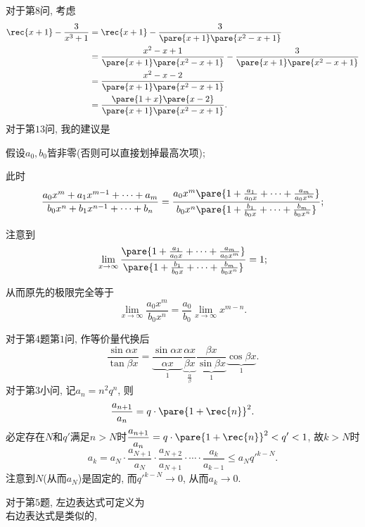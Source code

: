 \documentclass{ctexart}
\begin{document}
对于第$8$问, 考虑
\begin{align*}
    \rec{x+1} - \frac{3}{x^3+1} &= \rec{x+1} - \frac{3}{\pare{x+1}\pare{x^2-x+1}} \\
    &= \frac{x^2-x+1}{\pare{x+1}\pare{x^2-x+1}} -\frac{3}{\pare{x+1}\pare{x^2-x+1}} \\
    &= \frac{x^2-x-2}{\pare{x+1}\pare{x^2-x+1}} \\
    &= \frac{\pare{1+x}\pare{x-2}}{\pare{x+1}\pare{x^2-x+1}}.
\end{align*}
对于第$13$问, 我的建议是
\begin{cenum}
    \item 假设$a_0, b_0$皆非零(否则可以直接划掉最高次项);
    \item 此时
    \[ \frac{a_0 x^m + a_1 x^{m-1} + \cdots + a_m}{b_0 x^n + b_1 x^{n-1} + \cdots + b_n} = \frac{a_0 x^m\pare{1 + \frac{a_1}{a_0 x} + \cdots + \frac{a_m}{a_0x^m}}}{b_0 x^n\pare{1 + \frac{b_1}{b_0 x} + \cdots + \frac{b_m}{b_0x^n}}}; \]
    \item 注意到
    \[ \lim_{x\rightarrow \infty} \frac{\pare{1 + \frac{a_1}{a_0 x} + \cdots + \frac{a_m}{a_0x^m}}}{\pare{1 + \frac{b_1}{b_0 x} + \cdots + \frac{b_m}{b_0x^n}}} = 1; \]
    \item 从而原先的极限完全等于
    \[ \lim_{x\rightarrow\infty} \frac{a_0 x^m}{b_0 x^n} = \frac{a_0}{b_0} \lim_{x\rightarrow\infty} x^{m-n}. \]
\end{cenum}
对于第$4$题第$1$问, 作等价量代换后
\[ \frac{\sin \alpha x}{\tan \beta x} = \underbrace{\frac{\sin \alpha x}{\alpha x}}_{1} \underbrace{\frac{\alpha x}{\beta x}}_{\displaystyle \frac{\alpha}{\beta}} \underbrace{\frac{\beta x}{\sin \beta x}}_{1} \underbrace{\cos \beta x}_{1}. \]
对于第$3$小问, 记$a_n = n^2q^n$, 则
\[ \frac{a_{n+1}}{a_n} = q\cdot \pare{1+\rec{n}}^2. \]
必定存在$N$和$q'$满足$n>N$时$\displaystyle \frac{a_{n+1}}{a_n} = q\cdot \pare{1+\rec{n}}^2 < q' < 1$, 故$k>N$时
\[ a_k = a_N \cdot \frac{a_{N+1}}{a_N} \cdot \frac{a_{N+2}}{a_{N+1}} \cdot\cdots\cdot \frac{a_k}{a_{k-1}} \le a_N q'^{k-N}. \]
注意到$N$(从而$a_N$)是固定的, 而$q'^{k-N}\rightarrow 0$, 从而$a_k\rightarrow 0$.
\par
对于第$5$题, 左边表达式可定义为\\
右边表达式是类似的,\\
\end{document}
